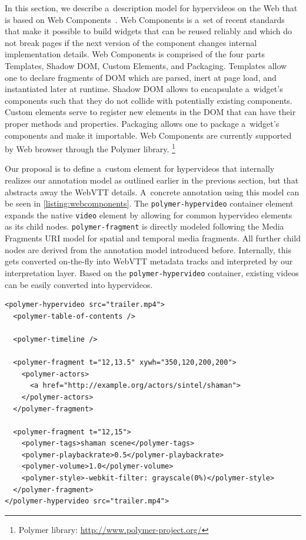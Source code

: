\documentclass[runningheads,a4paper]{llncs}
\newcommand{\inlinelistingsize}{\fontsize{8pt}{11pt}}
\let\oldurl\url
\renewcommand{\url}[1]{\inlinelistingsize\oldurl{#1}}
\begin{document}
In this section, we describe a~description model for hypervideos on the Web
that is based on Web Components~\cite{cooney2013webcomponents}.
Web Components is a~set of recent standards that
make it possible to build widgets that can be reused reliably
and which do not break pages if the next version of the component
changes internal implementation details.
Web Components is comprised of the four parts
Templates, Shadow DOM, Custom Elements, and Packaging.
Templates allow one to declare fragments of DOM which are parsed,
inert at page load, and instantiated later at runtime.
Shadow DOM allows to encapsulate a~widget's components
such that they do not collide with potentially existing components.
Custom elements serve to register new elements in the DOM
that can have their proper methods and properties.
Packaging allows one to package a~widget's components and make it importable.
Web Components are currently supported by Web browser through the Polymer library.%
\footnote{Polymer library: \url{http://www.polymer-project.org/}}

Our proposal is to define a~custom element for hypervideos
that internally realizes our annotation model
as outlined earlier in the previous section,
but that abstracts away the WebVTT details.
A~concrete annotation using this model can be seen in 
\autoref{listing:webcomponents}.
The \texttt{polymer-hypervideo} container element expands the native 
\texttt{video} element by allowing for common hypervideo elements as its child nodes.
\texttt{polymer-fragment} is directly modeled following
the Media Fragments URI model for spatial and temporal media fragments.
All further child nodes are derived from the annotation model introduced before.
Internally, this gets converted on-the-fly into WebVTT metadata tracks
and interpreted by our interpretation layer.
Based on the \texttt{polymer-hypervideo} container,
existing videos can be easily converted into hypervideos.

\begin{lstlisting}[caption={Web Components markup of a~hypervideo
  (prefix ``polymer-'' used to distinguish custom elements from native elements)},
  label=listing:webcomponents, float=t!]
<polymer-hypervideo src="trailer.mp4">
  <polymer-table-of-contents />

  <polymer-timeline />

  <polymer-fragment t="12,13.5" xywh="350,120,200,200">
    <polymer-actors>
      <a href="http://example.org/actors/sintel/shaman">
    </polymer-actors>
  </polymer-fragment>

  <polymer-fragment t="12,15">
    <polymer-tags>shaman scene</polymer-tags>
    <polymer-playbackrate>0.5</polymer-playbackrate>
    <polymer-volume>1.0</polymer-volume>
    <polymer-style>-webkit-filter: grayscale(0%)</polymer-style>
  </polymer-fragment>
</polymer-hypervideo src="trailer.mp4">
\end{lstlisting}
  
\end{document}
